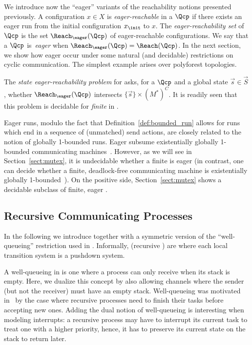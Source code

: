 \documentclass{LMCS}
\begin{document}
We introduce now the ``eager'' variants of the reachability notions
presented previously.  A configuration $x\in X$ is
\emph{eager-reachable} in a \qcp $\Qcp$ if there exists an eager run
from the initial configuration $x_\init$ to $x$.  The
\emph{eager-reachability set} of $\Qcp$ is the set
$\Reach_\eager(\Qcp)$ of eager-reachable configurations.  We say that
a \qcp $\Qcp$ is~\emph{eager} when $\Reach_\eager(\Qcp) =
\Reach(\Qcp)$. In the next section, we show how eager \qcp 
occur under some natural (and decidable) restrictions on cyclic
communication. The simplest example arises over polyforest
topologies. 



The \emph{state eager-reachability problem} for \qcp
asks, for a \qcp $\Qcp$ and a global state $\vec{s}\in
\vec{S}$, whether $\Reach_\eager(\Qcp)$ intersects $\{\vec{s}\} \times
(M^*)^C$.  It is readily seen that this problem is decidable for
\emph{finite} \qcp in \pspace.

Eager runs, modulo the fact that Definition~\ref{def:bounded_run}
allows for runs which end in a sequence of (unmatched) send actions,
are closely related to the notion of globally 1-bounded runs. Eager
\qcp subsume existentially globally 1-bounded communicating
machines~\cite{lohrey-m-2004-160-a,genest-b-2007-1-a}. However, as we
will see in Section~\ref{sect:mutex}, it is undecidable whether a
finite \qcp is eager (in contrast, one can decide whether a finite,
deadlock-free communicating machine is existentially globally 1-bounded~\cite{genest-b-2007-1-a}). On the
positive side, Section~\ref{sect:mutex} shows a decidable subclass of
finite, eager \qcp.







 \subsection{Recursive Communicating Processes}\label{ssec:rqcp}

In the following we introduce \rqcp together with a symmetric version
of the ``well-queueing'' restriction used in
\cite{latorre-s-2008-299-a}.
Informally, \rqcp (recursive \qcp) are  \qcp where each local
transition system is a pushdown system.


A well-queueing \rqcp in
\cite{latorre-s-2008-299-a} is one where a process can only receive
when its stack is empty. Here, we dualize this concept by also allowing
channels where the sender (but not the receiver) must have an empty
stack. Well-queueing was motivated
in~\cite{latorre-s-2008-299-a} by the case where recursive processes
need to finish their tasks before accepting new ones. Adding the dual notion
of well-queueing is interesting when modeling interrupts: a
recursive process may have to interrupt its current task to treat one
with a higher priority, hence, it has to preserve its current state on
the stack to return later.
\end{document}

